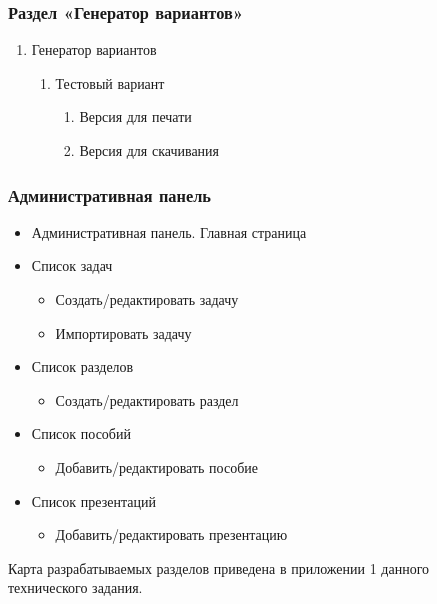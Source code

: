 \subsubsection{Раздел «Генератор вариантов»}
\begin{enumerate}
	\item Генератор вариантов
	\begin{enumerate}
		\item Тестовый вариант
		\begin{enumerate}
			\item Версия для печати
			\item Версия для скачивания
		\end{enumerate}
	\end{enumerate}
\end{enumerate}

\subsubsection{Административная панель}
\begin{itemize}
	\item Административная панель. Главная страница

	\item Список задач
	\begin{itemize}
		\item Создать/редактировать задачу
		\item Импортировать задачу
	\end{itemize}

	\item Список разделов
	\begin{itemize}
		\item Создать/редактировать раздел
	\end{itemize}

	\item Список пособий
	\begin{itemize}
		\item Добавить/редактировать пособие
	\end{itemize}

	\item Список презентаций
	\begin{itemize}
		\item Добавить/редактировать презентацию
	\end{itemize}
\end{itemize}

Карта разрабатываемых разделов приведена в приложении 1 данного технического задания.

